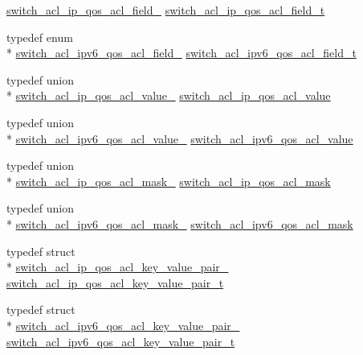 \begin{DoxyCompactItemize}
\hyperlink{group__ACL_ga41f645e0b1102677a2c747cb6d986ce3}{switch\+\_\+acl\+\_\+ip\+\_\+qos\+\_\+acl\+\_\+field\+\_\+} \hyperlink{group__ACL_gabf0b1b6cea0a8c9c68a6aa5dd967fabd}{switch\+\_\+acl\+\_\+ip\+\_\+qos\+\_\+acl\+\_\+field\+\_\+t}
\item 
typedef enum \\*
\hyperlink{group__ACL_ga3a2cce0ed542240f953c53cbd4b1fc47}{switch\+\_\+acl\+\_\+ipv6\+\_\+qos\+\_\+acl\+\_\+field\+\_\+} \hyperlink{group__ACL_ga04fee2dc3a028f2c3102fefc6a94c9c0}{switch\+\_\+acl\+\_\+ipv6\+\_\+qos\+\_\+acl\+\_\+field\+\_\+t}
\item 
typedef union \\*
\hyperlink{unionswitch__acl__ip__qos__acl__value__}{switch\+\_\+acl\+\_\+ip\+\_\+qos\+\_\+acl\+\_\+value\+\_\+} \hyperlink{group__ACL_gaf51ed29b57c3cbe23ec21680d51f9791}{switch\+\_\+acl\+\_\+ip\+\_\+qos\+\_\+acl\+\_\+value}
\item 
typedef union \\*
\hyperlink{unionswitch__acl__ipv6__qos__acl__value__}{switch\+\_\+acl\+\_\+ipv6\+\_\+qos\+\_\+acl\+\_\+value\+\_\+} \hyperlink{group__ACL_ga3e94be13b0d8d7a9970ae8755f88225e}{switch\+\_\+acl\+\_\+ipv6\+\_\+qos\+\_\+acl\+\_\+value}
\item 
typedef union \\*
\hyperlink{unionswitch__acl__ip__qos__acl__mask__}{switch\+\_\+acl\+\_\+ip\+\_\+qos\+\_\+acl\+\_\+mask\+\_\+} \hyperlink{group__ACL_ga06165cb67e82b9135066ccc4535bffbe}{switch\+\_\+acl\+\_\+ip\+\_\+qos\+\_\+acl\+\_\+mask}
\item 
typedef union \\*
\hyperlink{unionswitch__acl__ipv6__qos__acl__mask__}{switch\+\_\+acl\+\_\+ipv6\+\_\+qos\+\_\+acl\+\_\+mask\+\_\+} \hyperlink{group__ACL_ga870feb8d1167248e7f41128a8d18d63c}{switch\+\_\+acl\+\_\+ipv6\+\_\+qos\+\_\+acl\+\_\+mask}
\item 
typedef struct \\*
\hyperlink{structswitch__acl__ip__qos__acl__key__value__pair__}{switch\+\_\+acl\+\_\+ip\+\_\+qos\+\_\+acl\+\_\+key\+\_\+value\+\_\+pair\+\_\+} \hyperlink{group__ACL_gaf1d8bbd0da1b0b532818bedd154c0cdf}{switch\+\_\+acl\+\_\+ip\+\_\+qos\+\_\+acl\+\_\+key\+\_\+value\+\_\+pair\+\_\+t}
\item 
typedef struct \\*
\hyperlink{structswitch__acl__ipv6__qos__acl__key__value__pair__}{switch\+\_\+acl\+\_\+ipv6\+\_\+qos\+\_\+acl\+\_\+key\+\_\+value\+\_\+pair\+\_\+} \hyperlink{group__ACL_ga97bf6dff5ea4d17446d0c3619f6902c2}{switch\+\_\+acl\+\_\+ipv6\+\_\+qos\+\_\+acl\+\_\+key\+\_\+value\+\_\+pair\+\_\+t}

\end{DoxyCompactItemize}
